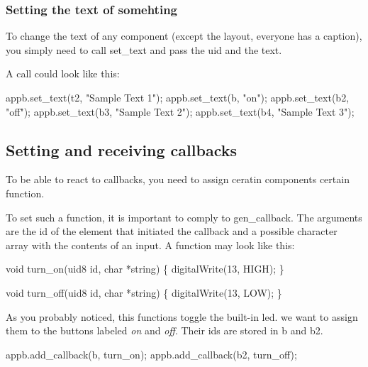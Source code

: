 \subsubsection*{Setting the text of somehting}

To change the text of any component (except the layout, everyone has a caption), you simply need to call {\ttfamily set\+\_\+text} and pass the uid and the text.

A call could look like this\+:


\begin{DoxyCode}
appb.set\_text(t2, \textcolor{stringliteral}{"Sample Text 1"});
appb.set\_text(b, \textcolor{stringliteral}{"on"});
appb.set\_text(b2, \textcolor{stringliteral}{"off"});
appb.set\_text(b3, \textcolor{stringliteral}{"Sample Text 2"});
appb.set\_text(b4, \textcolor{stringliteral}{"Sample Text 3"});
\end{DoxyCode}


\subsection*{Setting and receiving callbacks}

To be able to react to callbacks, you need to assign ceratin components certain function.

To set such a function, it is important to comply to {\ttfamily gen\+\_\+callback}. The arguments are the id of the element that initiated the callback and a possible character array with the contents of an input. A function may look like this\+:


\begin{DoxyCode}
\textcolor{keywordtype}{void} turn\_on(uid8 \textcolor{keywordtype}{id}, \textcolor{keywordtype}{char} *\textcolor{keywordtype}{string})
\{
    digitalWrite(13, HIGH);
\}

\textcolor{keywordtype}{void} turn\_off(uid8 \textcolor{keywordtype}{id}, \textcolor{keywordtype}{char} *\textcolor{keywordtype}{string})
\{
    digitalWrite(13, LOW);
\}
\end{DoxyCode}


As you probably noticed, this functions toggle the built-\/in led. we want to assign them to the buttons labeled {\itshape on} and {\itshape off}. Their ids are stored in {\ttfamily b} and {\ttfamily b2}.


\begin{DoxyCode}
appb.add\_callback(b, turn\_on);
appb.add\_callback(b2, turn\_off);
\end{DoxyCode}


